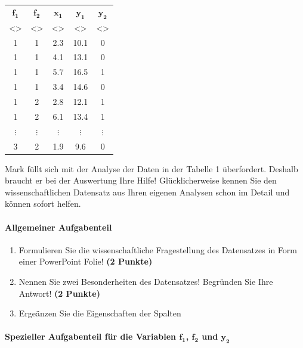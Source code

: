 \documentclass[a4paper, 9pt]{scrartcl}\usepackage[]{graphicx}\usepackage[]{xcolor}
\begin{document}
\begin{table}[h]
\centering
\Large
  \begin{tabular}{ccccc}
  \toprule
   $\boldsymbol{f_1}$  & $\boldsymbol{f_2}$ & $\boldsymbol{x_1}$ & $\boldsymbol{y_1}$ & $\boldsymbol{y_2}$ \\[2pt]
     <\phantom{xxx}>  & <\phantom{xxx}> & <\phantom{xxx}> & <\phantom{xxx}> & <\phantom{xxx}> \\[2pt] 
  \midrule
  1  & 1 & 2.3 & 10.1 & 0 \\  
  1  & 1 & 4.1 & 13.1 & 0 \\ 
  1  & 1 & 5.7 & 16.5 & 1 \\ 
  1  & 1 & 3.4 & 14.6 & 0 \\
  1  & 2 & 2.8 & 12.1 & 1 \\
  1  & 2 & 6.1 & 13.4 & 1 \\
  $\vdots$  & $\vdots$ & $\vdots$ & $\vdots$ & $\vdots$\\
  3 & 2  & 1.9 & 9.6 &  0\\
  \bottomrule
  \end{tabular}
\end{table}

Mark füllt sich mit der Analyse der Daten in der Tabelle 1 überfordert. Deshalb braucht er bei der Auswertung Ihre Hilfe! Glücklicherweise kennen Sie den wissenschaftlichen Datensatz aus Ihren eigenen Analysen schon im Detail und können sofort helfen.

\paragraph{Allgemeiner Aufgabenteil}

\begin{enumerate}
  \setcounter{enumi}{0}
  \item Formulieren Sie die wissenschaftliche Fragestellung des Datensatzes in Form einer PowerPoint Folie! \textbf{(2 Punkte)}
  \item Nennen Sie zwei Besonderheiten des Datensatzes! Begründen Sie Ihre Antwort! \textbf{(2 Punkte)}
  \item Ergeänzen Sie die Eigenschaften der Spalten 
\end{enumerate}

\paragraph{Spezieller Aufgabenteil für die Variablen $\boldsymbol{f_1}$, $\boldsymbol{f_2}$ und $\boldsymbol{y_2}$}
\end{document}
